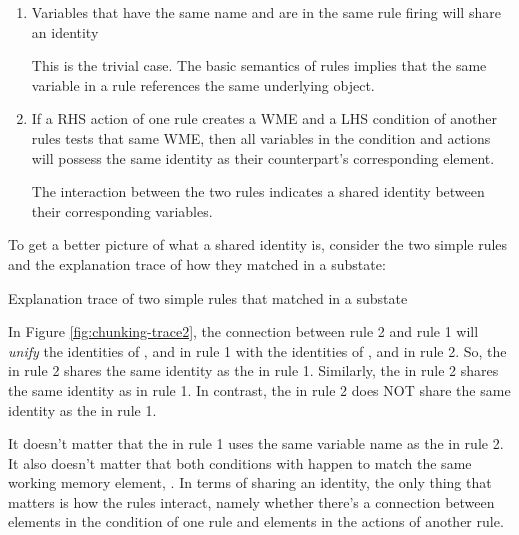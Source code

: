 \begin{enumerate}
	\item Variables that have the same name and are in the same rule firing will share an identity

	This is the trivial case.  The basic semantics of rules implies that the same variable in a rule references the same underlying object.

	\vspace{-6pt}
	\item If a RHS action of one rule creates a WME and a LHS condition of another rules tests that same WME, then all variables in the condition and actions will possess the same identity as their counterpart's corresponding element. 

	The interaction between the two rules indicates a shared identity between their corresponding variables.
	\vspace{-6pt}
\end{enumerate}

To get a better picture of what a shared identity is, consider the two simple rules and the explanation trace of how they matched in a substate: 

\vspace{12pt}
\begin{center}
	\captionsetup{type=figure}
	\centering{}
	\caption{Explanation trace of two simple rules that matched in a substate}
	\label{fig:chunking-trace2}
\end{center}

In Figure \ref{fig:chunking-trace2}, the connection between rule 2 and rule 1 will \textit{unify} the identities of ,  and  in rule 1 with the identities of ,  and  in rule 2.  So, the  in rule 2 shares the same identity as the  in rule 1.  Similarly, the  in rule 2 shares the same identity as  in rule 1.  In contrast, the  in rule 2 does NOT share the same identity as the  in rule 1. 

It doesn't matter that the  in rule 1 uses the same variable name as the  in rule 2.  It also doesn't matter that both conditions with  happen to match the same working memory element, .  In terms of sharing an identity, the only thing that matters is how the rules interact, namely whether there's a connection between elements in the condition of one rule and elements in the actions of another rule.

